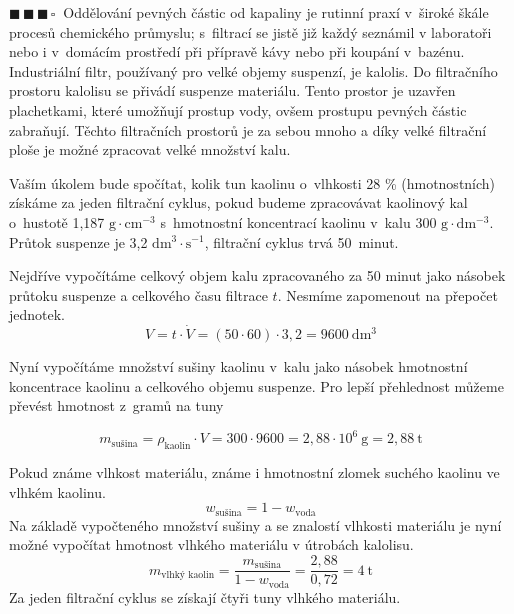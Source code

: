 \documentclass{book}
\newcommand{\tri}{$\blacksquare \, \blacksquare \, \blacksquare \, \square \; \; $}
\renewenvironment{quotation}{\par}{\par} %
\begin{document}
\hrulefill %
\begin{quotation}
\tri Oddělování pevných částic od kapaliny je rutinní praxí v~široké škále
procesů chemického průmyslu; s~filtrací se jistě již každý seznámil
v laboratoři nebo i v~domácím prostředí při přípravě kávy nebo při
koupání v~bazénu. Industriální filtr, používaný pro velké objemy
suspenzí, je kalolis. Do filtračního prostoru kalolisu se přivádí
suspenze materiálu. Tento prostor je uzavřen plachetkami, které umožňují
prostup vody, ovšem prostupu pevných částic zabraňují. Těchto filtračních
prostorů je za sebou mnoho a díky velké filtrační ploše je možné zpracovat
velké množství kalu.

Vaším úkolem bude spočítat, kolik tun kaolinu o~vlhkosti 28 \% (hmotnostních)
získáme za jeden filtrační cyklus, pokud budeme zpracovávat kaolinový
kal o~hustotě 1,187 $\mathrm{g\cdot cm^{-3}}$ s~hmotnostní koncentrací
kaolinu v~kalu 300 $\mathrm{g\cdot dm^{-3}}$. Průtok suspenze je 3,2 $\mathrm{dm^{3}\cdot s^{-1}}$,
filtrační cyklus trvá 50~minut.
\end{quotation} \dotfill \par 
Nejdříve vypočítáme celkový objem kalu zpracovaného za 50 minut jako
násobek průtoku suspenze a celkového času filtrace $t$. Nesmíme zapomenout
na přepočet jednotek. 
\[
V=t\cdot\dot{V}=(50\cdot60)\cdot3,2=9600\mathrm{~dm^{3}}
\]

\newpage %

Nyní vypočítáme množství sušiny kaolinu v~kalu jako násobek hmotnostní
koncentrace kaolinu a celkového objemu suspenze. Pro lepší přehlednost
můžeme převést hmotnost z~gramů na tuny

\[
m_{\text{sušina}}=\rho_{\text{kaolin}}\cdot V=300\cdot9600=2,88\cdot10^{6}\mathrm{~g}=2,88\mathrm{~t}
\]

Pokud známe vlhkost materiálu, známe i hmotnostní zlomek suchého kaolinu
ve vlhkém kaolinu.\[
w_{\text{sušina}}=1-w_{\text{voda}}
\]
Na základě vypočteného množství sušiny a se znalostí
vlhkosti materiálu je nyní možné vypočítat hmotnost vlhkého materiálu
v útrobách kalolisu. 
\[
m_{\text{vlhký kaolin}}=\frac{m_{\text{sušina}}}{1-w_{\text{voda}}}=\frac{2,88}{0,72}=4\mathrm{~t}
\]
Za jeden filtrační cyklus se získají čtyři tuny vlhkého materiálu.
\end{document}
